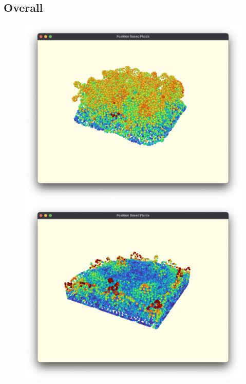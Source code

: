 \documentclass[sigplan,screen]{acmart}
\begin{document}
\subsection{Overall}

\begin{figure}
  \centering
  \includegraphics[width=\columnwidth]{images/simulation_start.png} \label{fig:sim_start}
  \vspace{0.00mm} 
  \includegraphics[width=\columnwidth]{images/simulation_middle.png} \label{fig:sim_middle}
  \vspace{0.00mm} 

\end{figure}
\end{document}
